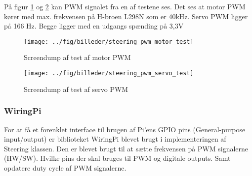 

\clearpage
På figur \ref{fig:steering_pwm_motor_test} og \ref{fig:steering_pwm_servo_test} kan PWM signalet fra en af testene ses. Det ses at motor PWM kører med max. frekvensen på H-broen L298N som er 40kHz. Servo PWM ligger på 166 Hz. Begge ligger med en udgangs spænding på 3,3V
\begin{figure}[h]
	\centering
	\texttt{[image: ../fig/billeder/steering\_pwm\_motor\_test]}
	\caption{Screendump af test af motor PWM}
	\label{fig:steering_pwm_motor_test}
\end{figure}

\begin{figure}[h]
	\centering
	\texttt{[image: ../fig/billeder/steering\_pwm\_servo\_test]}
	\caption{Screendump af test af servo PWM}
	\label{fig:steering_pwm_servo_test}
\end{figure}


\subsubsection*{WiringPi} \label{sec:wiringPi_impl}
For at få et forenklet interface til brugen af Pi'ens GPIO pins (General-purpose input/output) er biblioteket WiringPi \cite{lib:wiringpi_projekt} blevet brugt i implementeringen af Steering klassen. Den er blevet brugt til at sætte frekvensen på PWM signalerne (HW/SW). Hvilke pins der skal bruges til PWM og digitale outputs. Samt opdatere duty cycle af PWM signalerne.
